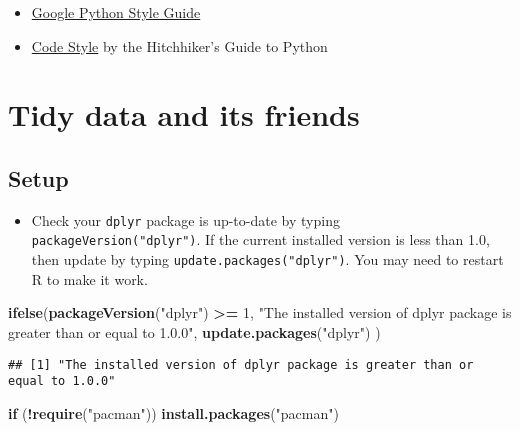 \documentclass[
]{book}
\newenvironment{Shaded}{\begin{snugshade}}{\end{snugshade}}
\newcommand{\ControlFlowTok}[1]{\textcolor[rgb]{0.13,0.29,0.53}{\textbf{#1}}}
\newcommand{\DecValTok}[1]{\textcolor[rgb]{0.00,0.00,0.81}{#1}}
\newcommand{\KeywordTok}[1]{\textcolor[rgb]{0.13,0.29,0.53}{\textbf{#1}}}
\newcommand{\NormalTok}[1]{#1}
\newcommand{\OperatorTok}[1]{\textcolor[rgb]{0.81,0.36,0.00}{\textbf{#1}}}
\newcommand{\StringTok}[1]{\textcolor[rgb]{0.31,0.60,0.02}{#1}}
\providecommand{\tightlist}{%
  \setlength{\itemsep}{0pt}\setlength{\parskip}{0pt}}
\begin{document}
\begin{itemize}
\begin{itemize}
\begin{itemize}
      \begin{itemize}
      \tightlist
      \item
        \href{https://github.com/google/styleguide/blob/gh-pages/pyguide.md}{Google Python Style Guide}
      \item
        \href{https://docs.python-guide.org/writing/style/\#zen-of-python}{Code Style} by the Hitchhiker's Guide to Python
      \end{itemize}
    \end{itemize}
  \end{itemize}
\end{itemize}

\hypertarget{tidy_data}{%
\chapter{Tidy data and its friends}\label{tidy_data}}

\hypertarget{setup-2}{%
\section{Setup}\label{setup-2}}

\begin{itemize}
\tightlist
\item
  Check your \texttt{dplyr} package is up-to-date by typing \texttt{packageVersion("dplyr")}. If the current installed version is less than 1.0, then update by typing \texttt{update.packages("dplyr")}. You may need to restart R to make it work.
\end{itemize}

\begin{Shaded}
\begin{Highlighting}[]
\KeywordTok{ifelse}\NormalTok{(}\KeywordTok{packageVersion}\NormalTok{(}\StringTok{"dplyr"}\NormalTok{) }\OperatorTok{\textgreater{}=}\StringTok{ }\DecValTok{1}\NormalTok{,}
  \StringTok{"The installed version of dplyr package is greater than or equal to 1.0.0"}\NormalTok{, }\KeywordTok{update.packages}\NormalTok{(}\StringTok{"dplyr"}\NormalTok{)}
\NormalTok{)}
\end{Highlighting}
\end{Shaded}

\begin{verbatim}
## [1] "The installed version of dplyr package is greater than or equal to 1.0.0"
\end{verbatim}

\begin{Shaded}
\begin{Highlighting}[]
\ControlFlowTok{if}\NormalTok{ (}\OperatorTok{!}\KeywordTok{require}\NormalTok{(}\StringTok{"pacman"}\NormalTok{)) }\KeywordTok{install.packages}\NormalTok{(}\StringTok{"pacman"}\NormalTok{)}
\end{Highlighting}
\end{Shaded}
\end{document}
